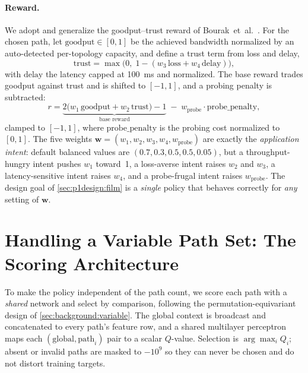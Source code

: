 \paragraph{Reward.} We adopt and generalize the goodput--trust reward of
Bourak~et~al.~\cite{Bourak2025}. For the chosen path, let $\mathrm{goodput}\in[0,1]$ be the achieved
bandwidth normalized by an auto-detected per-topology capacity, and define a trust term from loss and
delay,
\begin{equation}
\mathrm{trust} = \max\!\big(0,\; 1 - (w_3\,\mathrm{loss} + w_4\,\mathrm{delay})\big),
\label{eq:p1trust}
\end{equation}
with $\mathrm{delay}$ the latency capped at \SI{100}{\milli\second} and normalized. The base reward
trades goodput against trust and is shifted to $[-1,1]$, and a probing penalty is subtracted:
\begin{equation}
r = \underbrace{2\big(w_1\,\mathrm{goodput} + w_2\,\mathrm{trust}\big) - 1}_{\text{base reward}}
    \;-\; w_{\text{probe}}\cdot \mathrm{probe\_penalty},
\label{eq:p1reward}
\end{equation}
clamped to $[-1,1]$, where $\mathrm{probe\_penalty}$ is the probing cost normalized to $[0,1]$. The
five weights $\mathbf{w} = (w_1, w_2, w_3, w_4, w_{\text{probe}})$ are exactly the \emph{application
intent}: default balanced values are $(0.7, 0.3, 0.5, 0.5, 0.05)$, but a throughput-hungry intent
pushes $w_1$ toward~1, a loss-averse intent raises $w_2$ and $w_3$, a latency-sensitive intent raises
$w_4$, and a probe-frugal intent raises $w_{\text{probe}}$. The design goal of \cref{sec:p1design:film}
is a \emph{single} policy that behaves correctly for \emph{any} setting of $\mathbf{w}$.

\section{Handling a Variable Path Set: The Scoring Architecture}
\label{sec:p1design:scoring}

To make the policy independent of the path count, we score each path with a \emph{shared} network and
select by comparison, following the permutation-equivariant design of \cref{sec:background:variable}.
The global context is broadcast and concatenated to every path's feature row, and a shared multilayer
perceptron maps each $(\text{global}, \text{path}_i)$ pair to a scalar $Q$-value. Selection is
$\arg\max_i Q_i$; absent or invalid paths are masked to $-10^9$ so they can never be chosen and do not
distort training targets.


